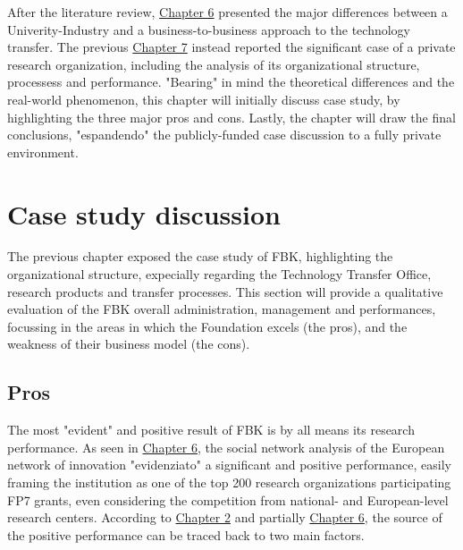 

\label{Chapter8} %

After the literature review, \hyperref[Chapter6]{Chapter 6} presented the major differences between a Univerity-Industry and a business-to-business approach to the technology transfer. The previous \hyperref[Chapter7]{Chapter 7} instead reported the significant case of a private research organization, including the analysis of its organizational structure, processess and performance. "Bearing" in mind the theoretical differences and the real-world phenomenon, this chapter will initially discuss case study, by highlighting the three major pros and cons. Lastly, the chapter will draw the final conclusions, "espandendo" the publicly-funded case discussion to a fully private environment.

\section{Case study discussion}

The previous chapter exposed the case study of FBK, highlighting the organizational structure, expecially regarding the Technology Transfer Office, research products and transfer processes. This section will provide a qualitative evaluation of the FBK overall administration, management and performances, focussing in the areas in which the Foundation excels (the pros), and the weakness of their business model (the cons).

\subsection{Pros}

The most "evident" and positive result of FBK is by all means its research performance. As seen in \hyperref[Chapter6]{Chapter 6}, the social network analysis of the European network of innovation "evidenziato" a significant and positive performance, easily framing the institution as one of the top 200 research organizations participating FP7 grants, even considering the competition from national- and European-level research centers. According to \hyperref[Chapter2]{Chapter 2} and partially \hyperref[Chapter6]{Chapter 6}, the source of the positive performance can be traced back to two main factors.

